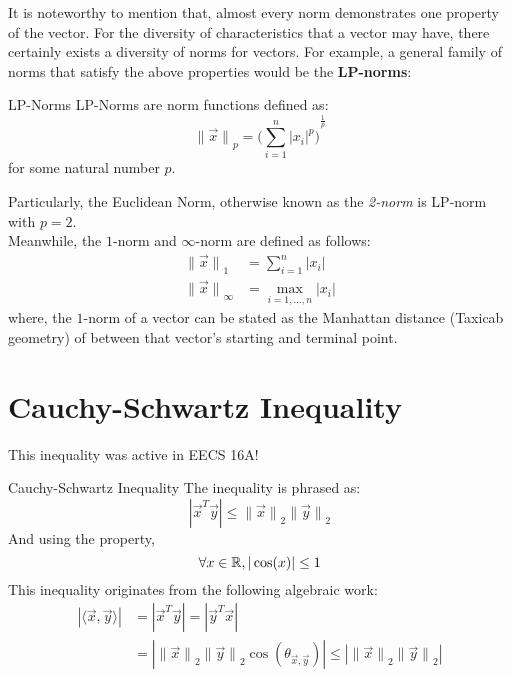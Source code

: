 It is noteworthy to mention that, almost every norm demonstrates one property of the vector.
For the diversity of characteristics that a vector may have, there certainly exists a diversity of norms for vectors.
For example, a general family of norms that satisfy the above properties would be the \textbf{LP-norms}:
\begin{ln-define}{LP-Norms}{}
    LP-Norms are norm functions defined as:
    \[
        {\lVert \vec{x} \rVert}_p = {\bigg( \sum_{i = 1}^n |x_i|^p \bigg)}^{\frac{1}{p}}
    \]
    for some natural number $p$. \\
\end{ln-define}
Particularly, the Euclidean Norm, otherwise known as the \textit{2-norm} is LP-norm with $p = 2$. \\
Meanwhile, the $1$-norm and $\infty$-norm are defined as follows:
\begin{align*}
    {\lVert \vec{x} \rVert}_1 &= \sum_{i = 1}^n |x_i| \\
    {\lVert \vec{x} \rVert}_\infty &= \max_{i = 1, \dots, n} |x_i|
\end{align*}
where, the $1$-norm of a vector can be stated as the Manhattan distance (Taxicab geometry) of between that vector's starting and terminal point.

\section{Cauchy-Schwartz Inequality}
This inequality was active in EECS 16A!
\begin{ln-define}{Cauchy-Schwartz Inequality}{}
    The inequality is phrased as:
    \[
        |\vec{x}^T \vec{y}| \leq {\lVert \vec{x} \rVert}_2 {\lVert \vec{y} \rVert}_2
    \]
    And using the property,
    \[\forall x \in \mathbb{R}, |\cos(x)| \leq 1\]
    \tcblower
    This inequality originates from the following algebraic work:
    \begin{align*}
        |\langle \vec{x}, \vec{y} \rangle| &= |\vec{x}^T \vec{y}| = |\vec{y}^T \vec{x}| \\
        &= |{\lVert \vec{x} \rVert}_2 {\lVert \vec{y} \rVert}_2 \cos(\theta_{\vec{x}, \vec{y}})|
        \leq |{\lVert \vec{x} \rVert}_2 {\lVert \vec{y} \rVert}_2|
    \end{align*}
\end{ln-define}


